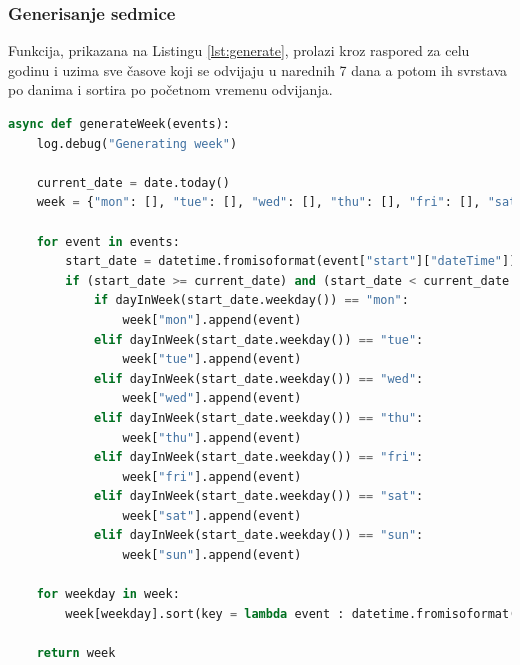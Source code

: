 \documentclass[a4paper,11pt]{article}
\begin{document}
\subsubsection{Generisanje sedmice}
Funkcija, prikazana na Listingu \ref{lst:generate}, prolazi kroz raspored za celu godinu i uzima sve časove koji se odvijaju u narednih 7 dana a potom ih svrstava po danima i sortira po početnom vremenu odvijanja.
\begin{lstlisting}[language=Python, caption=Generisanje sedmice, label=lst:generate]
async def generateWeek(events):
    log.debug("Generating week")

    current_date = date.today()
    week = {"mon": [], "tue": [], "wed": [], "thu": [], "fri": [], "sat": [], "sun": []}

    for event in events:
        start_date = datetime.fromisoformat(event["start"]["dateTime"]).date()
        if (start_date >= current_date) and (start_date < current_date + timedelta(days=7)):
            if dayInWeek(start_date.weekday()) == "mon":
                week["mon"].append(event)
            elif dayInWeek(start_date.weekday()) == "tue":
                week["tue"].append(event)
            elif dayInWeek(start_date.weekday()) == "wed":
                week["wed"].append(event)
            elif dayInWeek(start_date.weekday()) == "thu":
                week["thu"].append(event)
            elif dayInWeek(start_date.weekday()) == "fri":
                week["fri"].append(event)
            elif dayInWeek(start_date.weekday()) == "sat":
                week["sat"].append(event)
            elif dayInWeek(start_date.weekday()) == "sun":
                week["sun"].append(event)

    for weekday in week:
        week[weekday].sort(key = lambda event : datetime.fromisoformat(event["start"]["dateTime"]))

    return week
\end{lstlisting}
\newpage
\end{document}
